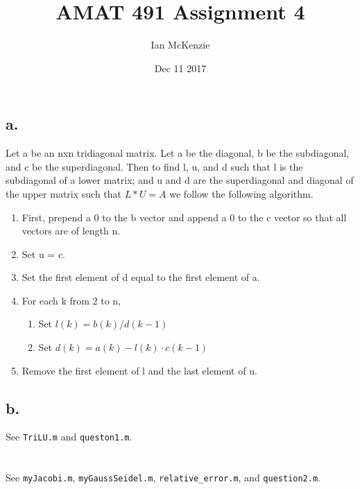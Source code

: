 \documentclass{article}
\title{AMAT 491 Assignment 4}
\date{Dec 11 2017}
\author{Ian McKenzie}
\begin{document}
\maketitle
\newpage
{}

\section{}
\subsection*{a.}
Let a be an nxn tridiagonal matrix. Let a be the diagonal, b be the
subdiagonal, and c be the superdiagonal. Then to find l, u, and d such
that l is the subdiagonal of a lower matrix; and u and d are the
superdiagonal and diagonal of the upper matrix such that \(L*U=A\) we
follow the following algorithm.
\begin{enumerate}[label*=\arabic*.]
  \item First, prepend a 0 to the b vector and append a 0 to the c
    vector so that all vectors are of length n.
  \item Set u = c.
  \item Set the first element of d equal to the first element of a.
  \item For each k from 2 to n,
    \begin{enumerate}[label*=\arabic*.]
    \item Set \(l(k) = b(k)/d(k-1)\)
    \item Set \(d(k) = a(k) - l(k)\cdot c(k-1)\)
    \end{enumerate}
  \item Remove the first element of l and the last element of u.
\end{enumerate}
\subsection*{b.}
See \texttt{TriLU.m} and \texttt{queston1.m}.

\section{}
See \texttt{myJacobi.m}, \texttt{myGaussSeidel.m},
\texttt{relative\_error.m}, and \texttt{question2.m}.

\end{document}
